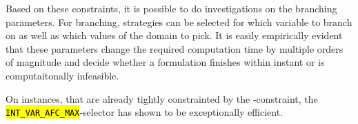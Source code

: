 \documentclass[,%
			paper=a4,%
			DIV12,
			liststotoc,
			bibtotoc,
			draft=false,%
			numbers=noendperiod
			]{scrartcl}
\newcommand{\ilc}[1]{\hl{\texttt{#1}}}
\begin{document}
Based on these constraints, it is possible to do investigations on the branching parameters. 
For branching, strategies can be selected for which variable to branch on as well as which values of the domain to pick.
It is easily empirically evident that these parameters change the required computation time by multiple orders of magnitude and decide whether a formulation finishes within instant or is computaitonally infeasible.

On instances, that are already tightly constrainted by the \Clandings-constraint, the \ilc{INT_VAR_AFC_MAX}-selector has shown to be exceptionally efficient.



 
\end{document}
